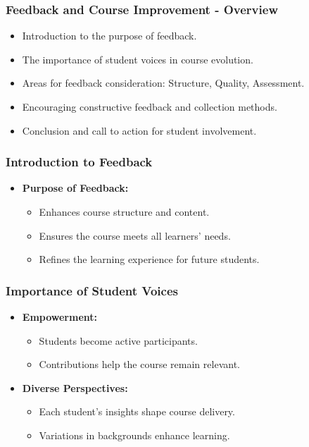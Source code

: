 \documentclass[aspectratio=169]{beamer}
\begin{document}
\begin{frame}[fragile]
    \frametitle{Feedback and Course Improvement - Overview}
    \begin{itemize}
        \item Introduction to the purpose of feedback.
        \item The importance of student voices in course evolution.
        \item Areas for feedback consideration: Structure, Quality, Assessment.
        \item Encouraging constructive feedback and collection methods.
        \item Conclusion and call to action for student involvement.
    \end{itemize}
\end{frame}

\begin{frame}[fragile]
    \frametitle{Introduction to Feedback}
    \begin{itemize}
        \item \textbf{Purpose of Feedback:}
        \begin{itemize}
            \item Enhances course structure and content.
            \item Ensures the course meets all learners' needs.
            \item Refines the learning experience for future students.
        \end{itemize}
    \end{itemize}
\end{frame}

\begin{frame}[fragile]
    \frametitle{Importance of Student Voices}
    \begin{itemize}
        \item \textbf{Empowerment:} 
        \begin{itemize}
            \item Students become active participants.
            \item Contributions help the course remain relevant.
        \end{itemize}
        \item \textbf{Diverse Perspectives:}
        \begin{itemize}
            \item Each student's insights shape course delivery.
            \item Variations in backgrounds enhance learning.
        \end{itemize}
    \end{itemize}
\end{frame}
\end{document}
